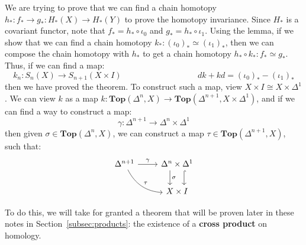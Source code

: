 \documentclass[11pt, oneside]{amsart}   	%
\theoremstyle{definition}
\begin{document}
We are trying to prove that we can find a chain homotopy $h_* : f_*\rightarrow g_* : H_*(X)\rightarrow H_*(Y)$ to prove the 
homotopy invariance. Since $H_*$ is a covariant functor, note that $f_* = h_*\circ\iota_0$ and $g_* = h_*\circ\iota_1$. 
Using the lemma, if we show that we can find a chain homotopy $k_* : (\iota_0)_*\simeq (\iota_1)_*$, then we can 
compose the chain homotopy with $h_*$ to get a chain homotopy $h_*\circ k_* : f_*\simeq g_*$. Thus, if we can 
find a map:
\begin{equation}
	k_n : S_n(X)\rightarrow S_{n + 1}(X\times I)\;\;\;\;\;\;\;\;\;\;\;\;\;\;\;\;\;\;\;\;\;\;\;\;\;\;\;\;\;\;\;\;\; dk + kd = (\iota_0)_* - (\iota_1)_*
\end{equation}
then we have proved the theorem. To construct such a map, view $X\times I\cong X\times\Delta^1$. We can view $k$ as  
a map $k : \textbf{Top}(\Delta^n, X)\rightarrow \textbf{Top}(\Delta^{n + 1}, X\times\Delta^1)$, and if we can find a way to 
construct a map:
\begin{equation}
	\gamma : \Delta^{n + 1}\rightarrow\Delta^n\times\Delta^1
\end{equation}
then given $\sigma\in\textbf{Top}(\Delta^n, X)$, we can construct a map $\tau\in\textbf{Top}(\Delta^{n + 1}, X)$, such that:
\begin{equation}\begin{tikzcd}
	\Delta^{n + 1}\arrow[r, "\gamma"] \arrow[dr, "\tau", bend right] & \Delta^n\times\Delta^1 
	\arrow[d, shift right=2ex, "\sigma"] \arrow[d, shift 
	left = 2ex, hook] \\
	& X\times I
\end{tikzcd}\end{equation}

To do this, we will take for granted a theorem that will be proven later in these notes in Section~\ref{subsec:products}: the 
existence of a \textbf{cross product} on homology. 
\end{document}
